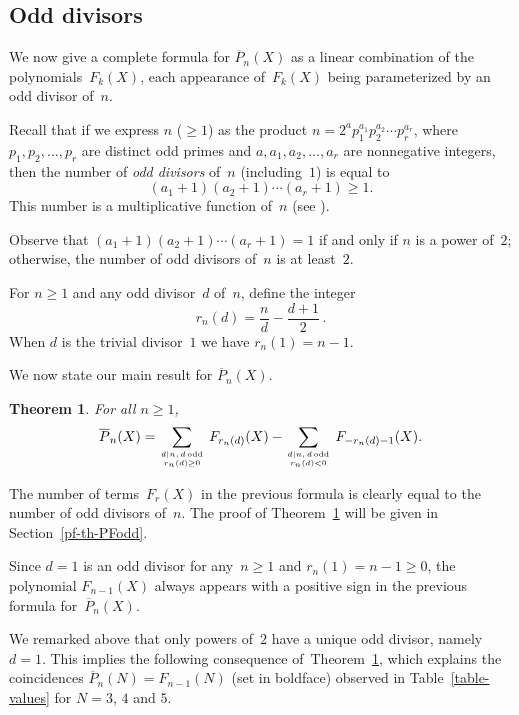 \documentclass[11pt, a4paper]{amsart}
\newtheorem{theorem}{Theorem}[section]
\theoremstyle{definition}
\newcommand\Pg{\overline{P}}
\numberwithin{equation}{section}
\begin{document}
\subsection{Odd divisors}\label{ssec-oddP}

We now give a complete formula for $\Pg_n(X)$ as a linear combination of the polynomials~$F_k(X)$, each appearance of~$F_k(X)$
being parameterized by an odd divisor of~$n$. 

Recall that if we express $n$ ($\geq 1$) as the product
$n = 2^a p_1^{a_1} p_2^{a_2} \cdots p_r^{a_r}$,
where $p_1, p_2, \ldots, p_r$ are distinct odd primes and $a, a_1, a_2, \ldots, a_r$ are nonnegative integers, 
then the number of \emph{odd divisors} of~$n$ (including~$1$) is equal to
\[
(a_1 + 1)(a_2 + 1) \cdots (a_r + 1) \geq 1.
\]
This number is a multiplicative function of~$n$ (see \cite[A001227]{OEIS}).

Observe that $(a_1 + 1)(a_2 + 1) \cdots (a_r + 1) = 1$ if and only if $n$ is a power of~$2$; 
otherwise, the number of odd divisors of~$n$ is at least~$2$.

For $n\geq 1$ and any odd divisor~$d$ of~$n$, define the integer 
\begin{equation}\label{eq-rnd}
r_n(d)  = \frac{n}{d} - \frac{d+1}{2} \, .
\end{equation}
When $d$ is the trivial divisor~$1$ we have $r_n(1) = n - 1$. 

We now state our main result for $\Pg_n(X)$.

\begin{theorem}\label{th-PFodd}
For all $n\geq 1$, 
\[
\Pg_n(X) = \sum_{d | n, \, d \, \mathrm{odd} \atop r_n(d) \geq 0} \, F_{r_n(d)}(X) 
- \sum_{d | n, \, d \, \mathrm{odd} \atop r_n(d) <0} \, F_{-r_n(d) -1}(X) .
\]
\end{theorem}

The number of terms~$F_r(X)$ in the previous formula is clearly equal to the number of odd divisors of~$n$.
The proof of Theorem~\ref{th-PFodd} will be given in Section~\ref{pf-th-PFodd}.

Since $d= 1$ is an odd divisor for any~$n\geq 1$ and $r_n(1) = n - 1 \geq 0$, the polynomial $F_{n-1}(X)$ always
appears with a positive sign in the previous formula for~$\Pg_n(X)$. 

We remarked above that only powers of~$2$ have a unique odd divisor, namely $d=1$.
This implies the following consequence of~Theorem~\ref{th-PFodd}, which explains the coincidences
$\Pg_n(N) = F_{n-1}(N)$  (set in boldface) observed in Table~\ref{table-values} for $N = 3$, $4$ and $5$.
\end{document}
